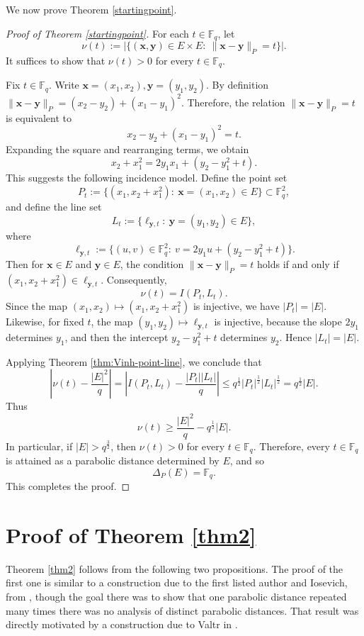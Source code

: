 \documentclass{article}
\newcommand{\F}{\mathbb{F}}
\newcommand{\1}{\mathbf{1}}
\begin{document}
We now prove Theorem \ref{startingpoint}.
\begin{proof}[Proof of Theorem \ref{startingpoint}]
For each $t\in \F_q$, let
\[
\nu(t):=\bigl|\{(\mathbf{x}, \mathbf{y})\in E\times E:\ \|\mathbf{x}-\mathbf{y}\|_{P}=t\}\bigr|.
\]
It suffices to show that $\nu(t)>0$ for every $t\in \F_q$.

Fix $t\in \F_q$. Write $\mathbf{x}=(x_1,x_2), \mathbf{y}=(y_1,y_2)$. 
By definition $\|\mathbf{x}-\mathbf{y}\|_{P}=(x_2-y_2)+(x_1-y_1)^2$.
Therefore, the relation $\|\mathbf{x}-\mathbf{y}\|_{P}=t$ is equivalent to
\[
x_2-y_2+(x_1-y_1)^2=t.
\]
Expanding the square and rearranging terms, we obtain
\[
x_2+x_1^2=2y_1x_1+(y_2-y_1^2+t).
\]
This suggests the following incidence model. Define the point set
\[
P_t:=\{(x_1,x_2+x_1^2):\ \mathbf{x}=(x_1,x_2)\in E\}\subset \F_q^2,
\]
and define the line set
\[
L_t:=\bigl\{\ell_{\mathbf{y},t}:\ \mathbf{y}=(y_1,y_2)\in E\bigr\},
\]
where
\[
\ell_{\mathbf{y},t}:=\{(u,v)\in \F_q^2:\ v=2y_1u+(y_2-y_1^2+t)\}.
\]
Then for $\mathbf{x}\in E$ and $\mathbf{y}\in E$, the condition $\|\mathbf{x}-\mathbf{y}\|_{P}=t$ holds if and only if $(x_1,x_2+x_1^2)\in \ell_{\mathbf{y},t}$.
Consequently,
\[
\nu(t)=I(P_t,L_t).
\]
Since the map $(x_1,x_2)\mapsto (x_1,x_2+x_1^2)$
is injective, we have $|P_t|=|E|$.
Likewise, for fixed $t$, the map $(y_1,y_2)\mapsto \ell_{\mathbf{y},t}$
is injective, because the slope $2y_1$ determines $y_1$, and then the intercept
$y_2-y_1^2+t$ determines $y_2$. 
Hence
$|L_t|=|E|$.

Applying Theorem \ref{thm:Vinh-point-line}, we conclude that
\[
\left|\nu(t)-\frac{|E|^2}{q}\right|
=
\left|I(P_t,L_t)-\frac{|P_t| |L_t|}{q}\right|
\le q^{\frac{1}{2}}|P_t|^{\frac{1}{2}}|L_t|^{\frac{1}{2}}
= q^{\frac{1}{2}}|E|.
\]
Thus
\[
\nu(t)\ge \frac{|E|^2}{q}-q^{\frac{1}{2}}|E|.
\]
In particular, if $|E|>q^{\frac{3}{2}}$, then $\nu(t)>0$ for every $t\in \F_q$. Therefore, every $t\in \F_q$ is attained as a parabolic distance determined by $E$, and so
\[
\Delta_P(E)=\F_q.
\]
This completes the proof.
\end{proof}


\section{Proof of Theorem \ref{thm2}}\label{sec:prime-counterexample}
Theorem \ref{thm2} follows from the following two propositions. The proof of the first one is similar to a construction due to the first listed author and Iosevich, from \cite{IS14}, though the goal there was to show that one parabolic distance repeated many times there was no analysis of distinct parabolic distances. That result was directly motivated by a construction due to Valtr in \cite{V05}.
\end{document}
